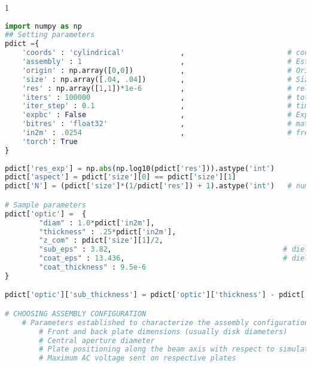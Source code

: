 \begin{spacing}{1}
\begin{lstlisting}[frame=single, language=Python]
import numpy as np
## Setting parameters
pdict ={
    'coords' : 'cylindrical'             ,                        # coordinate system chosen for simulation box
    'assembly' : 1                       ,                        # Establish plate geometry / location and voltage based on assembly 
    'origin' : np.array([0,0])           ,                        # Origin of the simulation space / map
    'size' : np.array([.04, .04])        ,                        # Size of simulation box [m] 
    'res' : np.array([1,1])*1e-6         ,                        # relative resolution [coord1, coord2]
    'iters' : 100000                     ,                        # total number of time iterations
    'iter_step' : 0.1                    ,                        # time step
    'expbc' : False                      ,                        # Exponential boundary conditions?
    'bitres' : 'float32'                 ,                        # matrix element data type ('float32' vs 'float64')
    'in2m' : .0254                       ,                        # frequently used conversion
    'torch': True
}
    
pdict['res_exp'] = np.abs(np.log10(pdict['res'])).astype('int')
pdict['aspect'] = pdict['size'][0] == pdict['size'][1]
pdict['N'] = (pdict['size']*(1/pdict['res']) + 1).astype('int')   # number of points sampled 1 dimension of simulation box

# Sample parameters
pdict['optic'] =  {
        "diam" : 1.0*pdict['in2m'],
        "thickness" : .25*pdict['in2m'], 
        "z_com" : pdict['size'][1]/2,
        "sub_eps" : 3.82,                                        # dielectric constant for substrate (fused silica)
        "coat_eps" : 13.436,                                     # dielectric constant for coating material (AlGaAs / GaAs)
        "coat_thickness" : 9.5e-6     
}

pdict['optic']['sub_thickness'] = pdict['optic']['thickness'] - pdict['optic']['coat_thickness']

# CHOOSING ASSEMBLY CONFIGURATION
    # Parameters established to characterize the assembly configurations:
        # Front and back plate dimensions (usually disk diameters)
        # Central aperture diameter
        # Plate positioning along the beam axis with respect to simulation size center
        # Maximum AC voltage sent on respective plates


\end{lstlisting}
\end{spacing}
